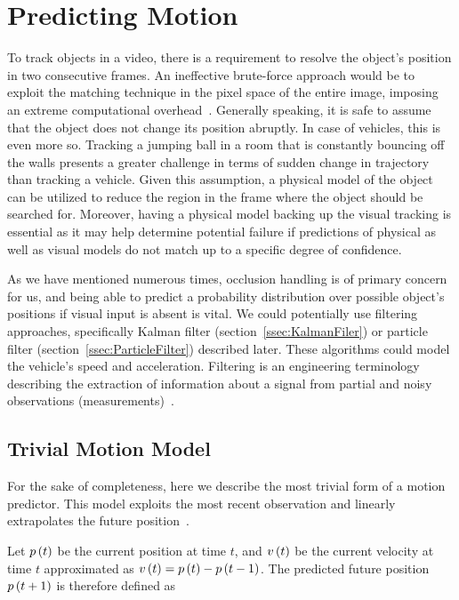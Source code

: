 \section{Predicting Motion}
\label{sec:PredictingMotion}

To track objects in a video, there is a requirement to resolve the object's position in two consecutive frames. An ineffective brute-force approach would be to exploit the matching technique in the pixel space of the entire image, imposing an extreme computational overhead~\cite{jalal2012sotavot}. Generally speaking, it is safe to assume that the object does not change its position abruptly. In case of vehicles, this is even more so. Tracking a jumping ball in a room that is constantly bouncing off the walls presents a greater challenge in terms of sudden change in trajectory than tracking a vehicle. Given this assumption, a physical model of the object can be utilized to reduce the region in the frame where the object should be searched for. Moreover, having a physical model backing up the visual tracking is essential as it may help determine potential failure if predictions of physical as well as visual models do not match up to a specific degree of confidence.

As we have mentioned numerous times, occlusion handling is of primary concern for us, and being able to predict a probability distribution over possible object's positions if visual input is absent is vital. We could potentially use filtering approaches, specifically Kalman filter (section~\ref{ssec:KalmanFiler}) or particle filter (section~\ref{ssec:ParticleFilter}) described later. These algorithms could model the vehicle's speed and acceleration. Filtering is an engineering terminology describing the extraction of information about a signal from partial and noisy observations (measurements)~\cite{kunsch2013particlefilter}.

\subsection{Trivial Motion Model}
\label{ssec:TrivialMotionModel}

For the sake of completeness, here we describe the most trivial form of a motion predictor. This model exploits the most recent observation and linearly extrapolates the future position~\cite{broida1986estimation}.

Let ${p} \left( t \right)$ be the current position at time $t$, and ${v} \left( t \right)$ be the current velocity at time $t$ approximated as ${v} \left( t \right) = {p} \left( t \right) - {p} \left( t - 1 \right)$. The predicted future position ${p} \left( t + 1 \right)$ is therefore defined as

